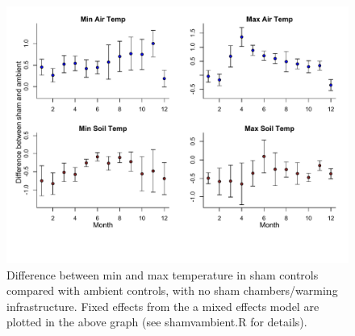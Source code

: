 \documentclass{article}
\begin{document}
\begin{figure}[p]
    \centering
\includegraphics{Analyses/figures/ShamVSAmbient_minmax.pdf}    
\caption{Difference between min and max temperature in sham controls compared with ambient controls, with no sham chambers/warming infrastructure. Fixed effects from the a mixed effects model are plotted in the above graph (see shamvambient.R for details). }
\end{figure}
\end{document}

